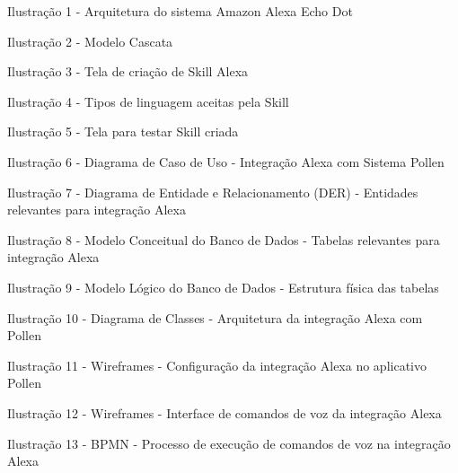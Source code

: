 \makeatletter
{}
\makeatother

\renewcommand{\baselinestretch}{1.5}\selectfont
\setlength{\parskip}{0pt}

\begin{flushleft}

Ilustração 1 - Arquitetura do sistema Amazon Alexa Echo Dot 

Ilustração 2 - Modelo Cascata 

Ilustração 3 - Tela de criação de Skill Alexa 

Ilustração 4 - Tipos de linguagem aceitas pela Skill 

Ilustração 5 - Tela para testar Skill criada 

Ilustração 6 - Diagrama de Caso de Uso - Integração Alexa com Sistema Pollen 

Ilustração 7 - Diagrama de Entidade e Relacionamento (DER) - Entidades relevantes para integração Alexa 

Ilustração 8 - Modelo Conceitual do Banco de Dados - Tabelas relevantes para integração Alexa 

Ilustração 9 - Modelo Lógico do Banco de Dados - Estrutura física das tabelas 

Ilustração 10 - Diagrama de Classes - Arquitetura da integração Alexa com Pollen 

Ilustração 11 - Wireframes - Configuração da integração Alexa no aplicativo Pollen 

Ilustração 12 - Wireframes - Interface de comandos de voz da integração Alexa 

Ilustração 13 - BPMN - Processo de execução de comandos de voz na integração Alexa 

\end{flushleft}

\renewcommand{\baselinestretch}{1.0}\selectfont
\setlength{\parskip}{\baselineskip}

